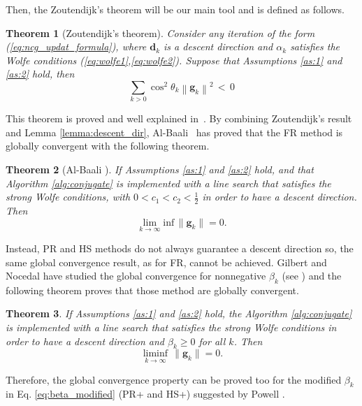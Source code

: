 \documentclass[11pt]{article}
\newtheorem{theorem}{Theorem}[section]
\newcommand{\norm}[1]{\left\lVert#1\right\rVert}
\begin{document}
Then, the Zoutendijk's theorem will be our main tool and is defined as follows.

\begin{theorem}[Zoutendijk’s theorem]
\label{th:Zoutendijk}
Consider any iteration of the form (\ref{eq:ncg_updat_formula}), where $\mathbf{d}_k$ is a descent direction and $\alpha_k$ satisfies the Wolfe conditions (\ref{eq:wolfe1},\ref{eq:wolfe2}). Suppose that Assumptions \ref{as:1} and \ref{as:2} hold, then
\begin{equation}
    \sum_{k > 0 } \cos^2 \theta_k \norm{\mathbf{g}_k}^2 \, < \, 0
    \label{eq:Zoutendijk_condition}
\end{equation}
\end{theorem}
This theorem is proved and well explained in~\cite{Nocedal, nocedal_global_convergence}. By combining Zoutendijk's result and Lemma \ref{lemma:descent_dir}, Al-Baali~\cite{baali} has proved that the FR method is globally convergent with the following theorem.

\begin{theorem}[Al-Baali \cite{baali}]
\label{th:FR_convergence}
If Assumptions \ref{as:1} and \ref{as:2} hold, and that Algorithm \ref{alg:conjugate} is implemented with a line search that satisfies the strong Wolfe conditions, with $0 < c_1 < c_2 < \frac{1}{2}$ in order to have a descent direction. Then
\begin{equation}
      \lim_{k\to\infty} \mathrm{inf} \, \|\mathbf{g}_k\| = 0.
\end{equation}
\end{theorem}

Instead, PR and HS methods do not always guarantee a descent direction so, the same global convergence result, as for FR, cannot be achieved. Gilbert and Nocedal have studied the global convergence for nonnegative $\beta_k$ (see \cite{nocedal_global_convergence}) and the following theorem proves that those method are globally convergent.
\begin{theorem}
\label{th:beta_mod_conv}
If Assumptions \ref{as:1} and \ref{as:2} hold, the Algorithm \ref{alg:conjugate} is implemented with a line search that satisfies the strong Wolfe conditions in order to have a descent direction and $\beta_k \geq 0$ for all $k$. Then
\begin{equation}
      \liminf_{k\to\infty} \, \|\mathbf{g}_k\| = 0.
\end{equation}
\end{theorem}

Therefore, the global convergence property can be proved too for the modified $\beta_k$ in Eq. \ref{eq:beta_modified} (PR+ and HS+) suggested by Powell \cite{powell}.\\
\end{document}
